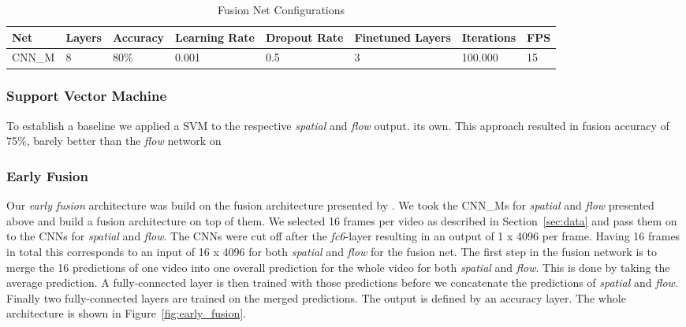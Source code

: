 \begin{table}[H]
\centering
\caption{Fusion Net Configurations}
\label{table:fusion_results}
\begin{tabularx}{\textwidth}{XXXXXXXX}
\toprule
Net 		& Layers	& Accuracy	& Learning Rate 	& Dropout Rate	& Finetuned Layers	& Iterations	& FPS\\ \midrule
CNN\_M		& 8			& 80\%		& 0.001			 	& 0.5			& 3					& 100.000		& 15\\
\bottomrule
\end{tabularx}
\end{table}


\subsubsection{Support Vector Machine}
To establish a baseline we applied a SVM to the respective \emph{spatial} and \emph{flow} output.
its own.
This approach resulted in fusion accuracy of 75\%, barely better than the \emph{flow} network on

\subsubsection{Early Fusion}
Our \emph{early fusion} architecture was build on the fusion architecture presented by .
We took the CNN\_Ms for \emph{spatial} and \emph{flow} presented above and build a fusion architecture on top of them.
We selected 16 frames per video as described in Section~\ref{sec:data} and pass them on to the CNNs for \emph{spatial} and \emph{flow}.
The CNNs were cut off after the \textit{fc6}-layer resulting in an output of 1 x 4096 per frame.
Having 16 frames in total this corresponds to an input of 16 x 4096 for both \emph{spatial} and \emph{flow} for the fusion net.
The first step in the fusion network is to merge the 16 predictions of one video into one overall prediction for the whole video for both \emph{spatial} and \emph{flow}.
This is done by taking the average prediction.
A fully-connected layer is then trained with those predictions before we concatenate the predictions of \emph{spatial} and \emph{flow}.
Finally two fully-connected layers are trained on the merged predictions.
The output is defined by an accuracy layer.
The whole architecture is shown in Figure~\ref{fig:early_fusion}.

